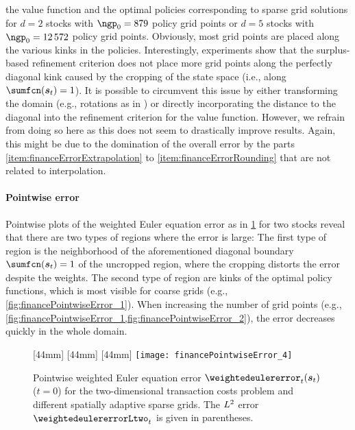 the value function and the optimal policies corresponding to
sparse grid solutions for
$d = 2$ stocks with $\ngp_0 = \num{879}$ policy grid points or
$d = 5$ stocks with $\ngp_0 = \num{12572}$ policy grid points.
Obviously, most grid points are placed along the various kinks in the
policies.
Interestingly, experiments show that the surplus-based refinement
criterion does not place more grid points along the perfectly diagonal kink
caused by the cropping of the state space
(i.e., along $\sumfcn(\vstock_t) = 1$).
It is possible to circumvent this issue by either
transforming the domain (e.g., rotations as in \cite{Bohn18Optimally}) or
directly incorporating the distance to the diagonal into the
refinement criterion for the value function.
However, we refrain from doing so here as this does not seem to
drastically improve results.
Again, this might be due to the domination of the overall error by
the parts \ref{item:financeErrorExtrapolation} to
\ref{item:financeErrorRounding} that are not related to interpolation.

\paragraph{Pointwise error}

Pointwise plots of the weighted Euler equation error
as in \cref{fig:financePointwiseError} for two stocks
reveal that there are two types of regions where the error is large:
The first type of region
is the neighborhood of the aforementioned diagonal boundary
$\sumfcn(\vstock_t) = 1$ of the uncropped region,
where the cropping distorts the error despite the weights.
The second type of region
are kinks of the optimal policy functions,
which is most visible for coarse grids
(e.g., \cref{fig:financePointwiseError_1}).
When increasing the number of grid points
(e.g., \cref{fig:financePointwiseError_1,fig:financePointwiseError_2}),
the error decreases quickly in the whole domain.

\begin{figure}
  [44mm]{%
  }%
  [44mm]{%
  }%
  [44mm]{%
  }%
  \hfill%
  \texttt{[image: financePointwiseError\_4]}%
  \caption[Pointwise weighted Euler equation error for different grids]{%
    Pointwise weighted Euler equation error $\weightedeulererror_t(\vstock_t)$
    ($t = 0$) for the two-dimensional transaction costs problem and
    different spatially adaptive sparse grids.
    The $L^2$ error $\weightedeulererrorLtwo_t$ is given in
    parentheses.%
  }%
  \label{fig:financePointwiseError}%
\end{figure}

